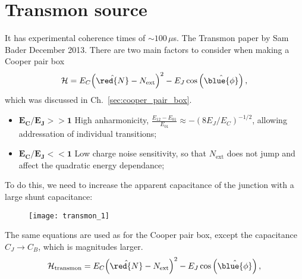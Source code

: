 \section{Transmon source\label{sec:transmon-source}}

It has  experimental coherence times of  $ \sim 100\,\mu $s.   The Transmon
paper by Sam Bader December 2013. There are two main factors to consider
when making a Cooper pair box
\begin{equation}\label{key}
  \mathcal{H} = E_C{\left(\hat{\red{N}}-N_\text{ext}\right)^2}- E_J\cos\left(\hat{\blue{\phi}}\right),
\end{equation}
\noindent which was discussed in Ch.~\ref{sec:cooper_pair_box}.

\begin{itemize}
\item    $    \mathbf{E_C/E_J    >>   1    }$    {High    anharmonicity,
    $  \frac{E_{12} -  E_{01}}{E_{01}}\approx  -(8E_J/E_C)^{-1/2} $,  allowing
    addressation of individual transitions};
\item $  \mathbf{E_C/E_J <<1 }$  {Low charge noise sensitivity,  so that
    $  N_\text{ext} $  does not  jump  and affect  the quadratic  energy
    dependance};
\end{itemize}

\noindent     {} To do this, we
need to increase  the apparent capacitance of the junction  with a large
shunt capacitance:

\begin{figure}[h]
  \centering \texttt{[image: transmon\_1]}
\end{figure}

\noindent

\begin{framed}\noindent
  The same  equations are used  as for the  Cooper pair box,  except the
  capacitance $ C_J \rightarrow C_B$, which is magnitudes larger.
  \begin{equation}\label{key}
    \mathcal{H}_\text{transmon} = E_C{\left(\hat{\red{N}}-N_\text{ext}\right)^2}- E_J\cos\left(\hat{\blue{\phi}}\right),
  \end{equation}

\end{framed}

\newpage
